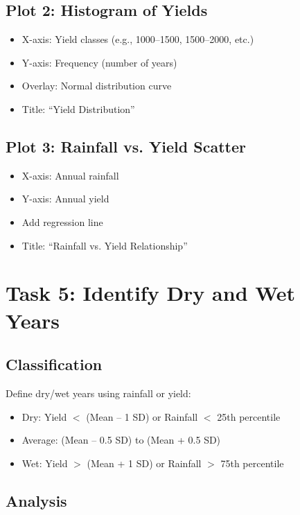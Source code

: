 \subsection{Plot 2: Histogram of Yields}

\begin{itemize}
  \item X-axis: Yield classes (e.g., 1000--1500, 1500--2000, etc.)
  \item Y-axis: Frequency (number of years)
  \item Overlay: Normal distribution curve
  \item Title: ``Yield Distribution''
\end{itemize}

\subsection{Plot 3: Rainfall vs. Yield Scatter}

\begin{itemize}
  \item X-axis: Annual rainfall
  \item Y-axis: Annual yield
  \item Add regression line
  \item Title: ``Rainfall vs. Yield Relationship''
\end{itemize}

\section{Task 5: Identify Dry and Wet Years}

\subsection{Classification}

Define dry/wet years using rainfall or yield:
\begin{itemize}
  \item Dry: Yield $<$ (Mean -- 1 SD) or Rainfall $<$ 25th percentile
  \item Average: (Mean -- 0.5 SD) to (Mean + 0.5 SD)
  \item Wet: Yield $>$ (Mean + 1 SD) or Rainfall $>$ 75th percentile
\end{itemize}

\subsection{Analysis}

